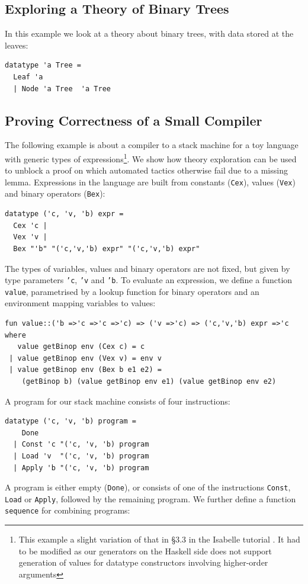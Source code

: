 \subsection{Exploring a Theory of Binary Trees}
In this example we look at a theory about binary trees, with data stored at the leaves:
\begin{verbatim}
datatype 'a Tree = 
  Leaf 'a 
  | Node 'a Tree  'a Tree
\end{verbatim}

\subsection{Proving Correctness of a Small Compiler}
The following example is about a compiler to a stack machine for a toy language with generic types of expressions\footnote{This example a slight variation of that in \S3.3 in the Isabelle tutorial \cite{isabelle}. It had to be modified as our generators on the Haskell side does not support generation of values for datatype constructors involving higher-order arguments}. We show how theory exploration can be used to unblock a proof on which automated tactics otherwise fail due to a missing lemma.
Expressions in the language are built from constants (\texttt{Cex}), values (\texttt{Vex}) and binary operators (\texttt{Bex}): 
\begin{verbatim}
datatype ('c, 'v, 'b) expr =
  Cex 'c |
  Vex 'v |
  Bex "'b" "('c,'v,'b) expr" "('c,'v,'b) expr"
\end{verbatim}
The types of variables, values and binary operators are not fixed, but given by type parameters \texttt{'c}, \texttt{'v} and \texttt{'b}. 
To evaluate an expression, we define a function \texttt{value}, parametrised by a lookup function for binary operators and an environment mapping variables to values:
\begin{verbatim}
fun value::('b =>'c =>'c =>'c) => ('v =>'c) => ('c,'v,'b) expr =>'c
where
   value getBinop env (Cex c) = c
 | value getBinop env (Vex v) = env v
 | value getBinop env (Bex b e1 e2) = 
    (getBinop b) (value getBinop env e1) (value getBinop env e2)
\end{verbatim}
A program for our stack machine consists of four instructions:
\begin{verbatim}
datatype ('c, 'v, 'b) program =
    Done
  | Const 'c "('c, 'v, 'b) program
  | Load 'v  "('c, 'v, 'b) program
  | Apply 'b "('c, 'v, 'b) program
\end{verbatim}
A program is either empty (\texttt{Done}), or consists of one of the instructions \texttt{Const}, \texttt{Load} or \texttt{Apply}, followed by the remaining program. We further define a function \texttt{sequence} for combining programs:
